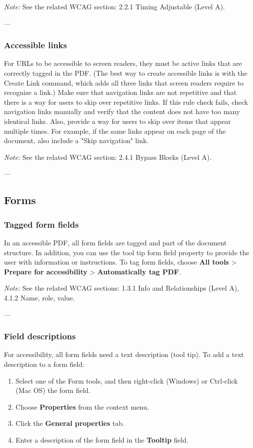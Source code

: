 \vspace{0.5em}
\noindent\textit{Note:} See the related WCAG section: 2.2.1 Timing Adjustable (Level A)\footnotemark[1].

---

\subsubsection*{Accessible links}
For URLs to be accessible to screen readers, they must be active links that are correctly tagged in the PDF. (The best way to create accessible links is with the Create Link command, which adds all three links that screen readers require to recognize a link.) Make sure that navigation links are not repetitive and that there is a way for users to skip over repetitive links\footnotemark[1].
If this rule check fails, check navigation links manually and verify that the content does not have too many identical links. Also, provide a way for users to skip over items that appear multiple times. For example, if the same links appear on each page of the document, also include a "Skip navigation" link.

\vspace{0.5em}
\noindent\textit{Note:} See the related WCAG section: 2.4.1 Bypass Blocks (Level A)\footnotemark[1].

---

\subsection*{Forms}
\subsubsection*{Tagged form fields}
In an accessible PDF, all form fields are tagged and part of the document structure. In addition, you can use the tool tip form field property to provide the user with information or instructions\footnotemark[1].
To tag form fields, choose \textbf{All tools} > \textbf{Prepare for accessibility} > \textbf{Automatically tag PDF}.

\vspace{0.5em}
\noindent\textit{Note:} See the related WCAG sections: 1.3.1 Info and Relationships (Level A), 4.1.2 Name, role, value\footnotemark[1].

---

\subsubsection*{Field descriptions}
For accessibility, all form fields need a text description (tool tip)\footnotemark[1].
To add a text description to a form field:
\begin{enumerate}
    \item Select one of the Form tools, and then right-click (Windows) or Ctrl-click (Mac OS) the form field.
    \item Choose \textbf{Properties} from the context menu.
    \item Click the \textbf{General properties} tab.
    \item Enter a description of the form field in the \textbf{Tooltip} field.
\end{enumerate}

